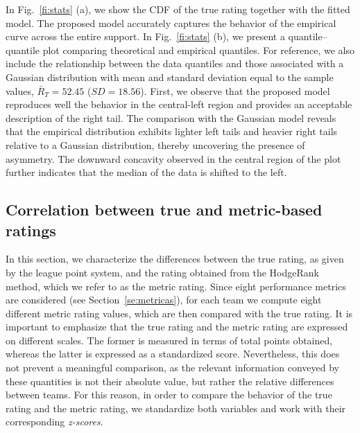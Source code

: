 \documentclass[preprint, amsmath,amssymb, pre]{revtex4-2}
\begin{document}
%
In Fig.~\ref{fi:stats} (a), we show the CDF of the true rating together with the fitted model. The proposed model accurately captures the behavior of the empirical curve across the entire support. In Fig.~\ref{fi:stats} (b), we present a quantile--quantile plot comparing theoretical and empirical quantiles. For reference, we also include the relationship between the data quantiles and those associated with a Gaussian distribution with mean and standard deviation equal to the sample values, $\bar{R}_T = 52.45$ ($SD = 18.56$).
%
First, we observe that the proposed model reproduces well the behavior in the central-left region and provides an acceptable description of the right tail. The comparison with the Gaussian model reveals that the empirical distribution exhibits lighter left tails and heavier right tails relative to a Gaussian distribution, thereby uncovering the presence of asymmetry. The downward concavity observed in the central region of the plot further indicates that the median of the data is shifted to the left.



\subsection{Correlation between true and metric-based ratings}
\label{sse:corr}

In this section, we characterize the differences between the true rating, as given by the league point system, and the rating obtained from the HodgeRank method, which we refer to as the metric rating.
%
Since eight performance metrics are considered (see Section~\ref{se:metricas}), for each team we compute eight different metric rating values, which are then compared with the true rating.
%
It is important to emphasize that the true rating and the metric rating are expressed on different scales. The former is measured in terms of total points obtained, whereas the latter is expressed as a standardized score.
%
Nevertheless, this does not prevent a meaningful comparison, as the relevant information conveyed by these quantities is not their absolute value, but rather the relative differences between teams.
%
For this reason, in order to compare the behavior of the true rating and the metric rating, we standardize both variables and work with their corresponding {\it z-scores}.
\end{document}
